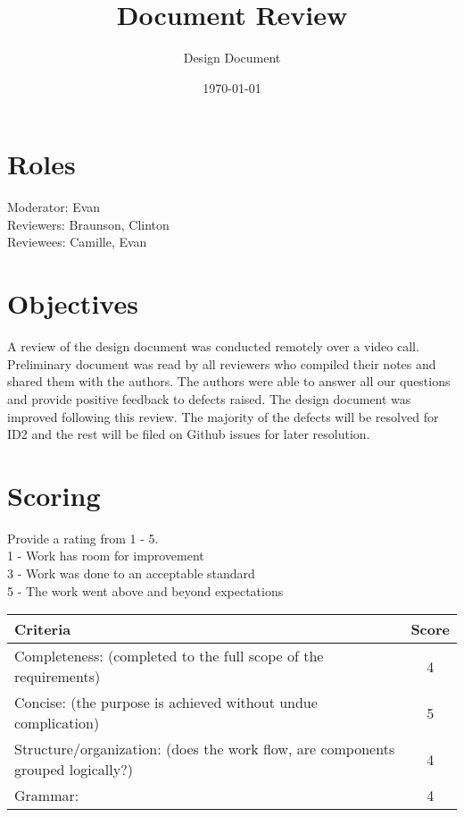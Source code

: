 \documentclass{article}
\title{Document Review}
\author{Design Document}
\date{\today}
\begin{document}
\maketitle

\section{Roles}
Moderator: Evan \\
Reviewers: Braunson, Clinton \\
Reviewees: Camille, Evan \\

\section{Objectives}

A review of the design document was conducted remotely over
a video call. Preliminary document was read by all reviewers who
compiled their notes and shared them with the authors. The 
authors were able to answer all our questions and provide positive
feedback to defects raised. The design document was improved following
this review. The majority of the defects will be resolved for ID2 and
the rest will be filed on Github issues for later resolution.

\section{Scoring}
    Provide a rating from 1 - 5. \\
    1 - Work has room for improvement \\
    3 - Work was done to an acceptable standard \\
    5 - The work went above and beyond expectations\\

\begin{tabular}{|l|c|}
	\hline
	Criteria & Score\\
	\hline
    Completeness:
    (completed to the full scope of the requirements) & 4 \\
	\hline
    Concise:
    (the purpose is achieved without undue complication) & 5 \\
	\hline
    Structure/organization:
    (does the work flow, are components grouped logically?) & 4 \\
    \hline
    Grammar: & 4 \\
    \hline
\end{tabular}
\end{document}
